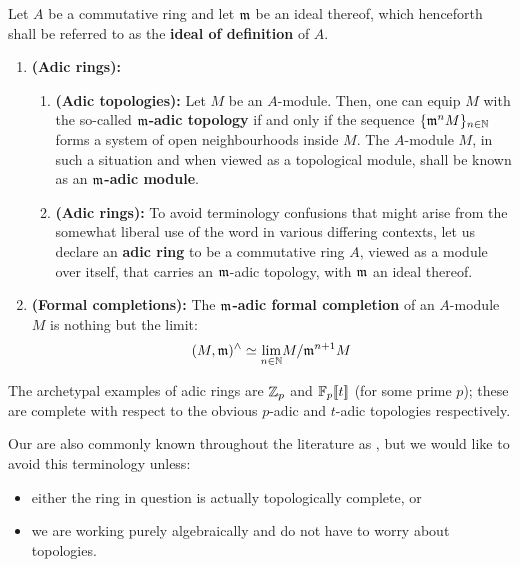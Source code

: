                 \begin{definition} \label{def: adic_modules}
                    Let $A$ be a commutative ring and let $\mathfrak{m}$ be an ideal thereof, which henceforth shall be referred to as the \textbf{ideal of definition} of $A$.
                        \begin{enumerate}
                            \item \textbf{(Adic rings):} 
                                \begin{enumerate}
                                    \item \textbf{(Adic topologies):} Let $M$ be an $A$-module. Then, one can equip $M$ with the so-called \textbf{$\mathfrak{m}$-adic topology} if and only if the sequence $\{\mathfrak{m}^nM\}_{n \in \mathbb{N}}$ forms a system of open neighbourhoods inside $M$. The $A$-module $M$, in such a situation and when viewed as a topological module, shall be known as an \textbf{$\mathfrak{m}$-adic module}.
                                    \item \textbf{(Adic rings):} To avoid terminology confusions that might arise from the somewhat liberal use of the word  in various differing contexts, let us declare an \textbf{adic ring} to be a commutative ring $A$, viewed as a module over itself, that carries an $\mathfrak{m}$-adic topology, with $\mathfrak{m}$ an ideal thereof. 
                                \end{enumerate}
                            \item \textbf{(Formal completions):} The \textbf{$\mathfrak{m}$-adic formal completion} of an $A$-module $M$ is nothing but the limit:
                                $$(M, \mathfrak{m})^{\wedge} \simeq \underset{n \in \mathbb{N}}{\operatorname{lim}} M/\mathfrak{m}^{n + 1}M$$
                        \end{enumerate}
                \end{definition}
                \begin{example}
                    The archetypal examples of adic rings are $\mathbb{Z}_p$ and $\mathbb{F}_p[\![t]\!]$ (for some prime $p$); these are complete with respect to the obvious $p$-adic and $t$-adic topologies respectively.
                \end{example}
                \begin{remark}
                    Our  are also commonly known throughout the literature as , but we would like to avoid this terminology unless:
                        \begin{itemize}
                            \item either the ring in question is actually topologically complete, or
                            \item we are working purely algebraically and do not have to worry about topologies.
                        \end{itemize}
                \end{remark}
                
